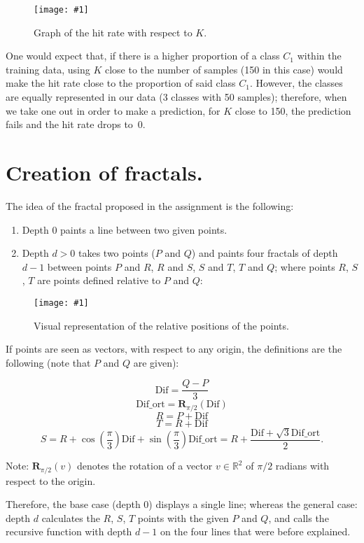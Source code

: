 \documentclass{article}
\newcommand{\myFigure}[4]{%
    \begin{figure}[H]
        \texttt{[image: \#1]}
        \centering
        \caption{#2}
        \label{#3}
    \end{figure}
}
\begin{document}
\myFigure{./img/gnuplot_graph.png}{Graph of the hit rate with respect to $K$.}{graph}{.8}

One would expect that, if there is a higher proportion of a class $C_1$ within the training data, using $K$ close to the number of samples (150 in this case) would make the hit rate close to the proportion of said class $C_1$. However, the classes are equally represented in our data (3 classes with 50 samples); therefore, when we take one out in order to make a prediction, for $K$ close to 150, the prediction fails and the hit rate drops to~0.

\newpage
\section{Creation of fractals.}

The idea of the fractal proposed in the assignment is the following:

\begin{enumerate}
    \item Depth 0 paints a line between two given points.
    \item Depth $d>0$ takes two points ($P$ and $Q$) and paints four fractals of depth $d-1$ between points $P$ and $R$, $R$ and $S$, $S$ and $T$, $T$ and $Q$; where points $R$, $S$, $T$ are points defined relative to $P$ and $Q$: 
\end{enumerate}

\myFigure{./files/fractal}{Visual representation of the relative positions of the points.}{img:fractal}{.6}

If points are seen as vectors, with respect to any origin, the definitions are the following (note that $P$ and $Q$ are given):

\[
    \text{Dif} = \frac{Q-P}{3}
\] 
\[
    \text{Dif\_ort} = \textbf{R}_{\pi/2}(\text{Dif})
\]
\[
    R = P + \text{Dif}
\]
\[
    T = R + \text{Dif}
\]
\[
    S = R + \cos\left(\frac{\pi}{3}\right)\text{Dif} + \sin\left(\frac{\pi}{3}\right)\text{Dif\_ort} = R + \frac{\text{Dif} + \sqrt{3}\text{Dif\_ort}}{2}.
\]

Note: $\textbf{R}_{\pi/2}(v)$ denotes the rotation of a vector $v\in\mathbb{R}^{2}$ of $\pi/2$ radians with respect to the origin. 

Therefore, the base case (depth 0) displays a single line; whereas the general case: depth $d$ calculates the $R$, $S$, $T$ points with the given $P$ and $Q$, and calls the recursive function with depth $d-1$ on the four lines that were before explained.
\end{document}
